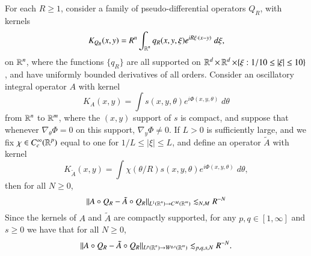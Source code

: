\begin{lemma} \label{lemma:WaveOscillatoryLemmaddw}
  For each $R \geq 1$, consider a family of pseudo-differential operators $Q_R$, with kernels 
  \[ K_{Q_R}(x,y) = R^n \int_{\operatorname{\mathbb{R}}^n} q_R(x,y, \xi) e^{i R \xi \cdot (x - y)}\; d\xi, \]
  on $\operatorname{\mathbb{R}}^n$, where the functions $\{ q_R \}$ are all supported on $\operatorname{\mathbb{R}}^d \times \operatorname{\mathbb{R}}^d \times \{ \xi: 1/10 \leq |\xi| \leq 10 \}$, and have uniformly bounded derivatives of all orders. Consider an oscillatory integral operator $A$ with kernel
  \[ K_A(x,y) = \int s(x,y,\theta) e^{i \Phi(x,y,\theta)}\; d\theta \]
  from $\operatorname{\mathbb{R}}^n$ to $\operatorname{\mathbb{R}}^m$, where the $(x,y)$ support of $s$ is compact, and suppose that whenever $\nabla_\theta \Phi = 0$ on this support, $\nabla_y \Phi \neq 0$. If $L > 0$ is sufficiently large, and we fix $\chi \in C_c^\infty(\operatorname{\mathbb{R}}^p)$ equal to one for $1/L \leq |\xi| \leq L$, and define an operator $\tilde{A}$ with kernel
  \[ K_{\tilde{A}}(x,y) = \int \chi( \theta / R ) s(x,y,\theta) e^{i \Phi(x,y,\theta)}\; d\theta, \]
  then for all $N \geq 0$,
  \[ \| A \circ Q_R - \tilde{A} \circ Q_R \|_{L^1(\operatorname{\mathbb{R}}^n) \to C^M(\operatorname{\mathbb{R}}^m)} \lesssim_{N,M} R^{-N} \]
  Since the kernels of $A$ and $\tilde{A}$ are compactly supported, for any $p,q \in [1,\infty]$ and $s \geq 0$ we have that for all $N \geq 0$,
  \[  \| A \circ Q_R - \tilde{A} \circ Q_R \|_{L^p(\operatorname{\mathbb{R}}^n) \to W^{q,s}(\operatorname{\mathbb{R}}^m)} \lesssim_{p,q,s,N} R^{-N}. \]
\end{lemma}
